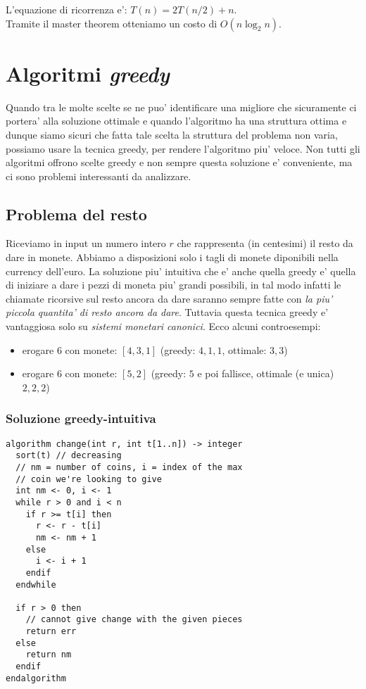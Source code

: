 \documentclass{article}
\begin{document}
L'equazione di ricorrenza e': $T(n) = 2T(n/2) + n$. \\
Tramite il master theorem otteniamo un costo di $O(n \log_2 n)$.

\section{Algoritmi \emph{greedy}}

Quando tra le molte scelte se ne puo' identificare una migliore che sicuramente
ci portera' alla soluzione ottimale e quando l'algoritmo ha una struttura ottima
e dunque siamo sicuri che fatta tale scelta la struttura del problema non varia,
possiamo usare la tecnica greedy, per rendere l'algoritmo piu' veloce.
Non tutti gli algoritmi offrono scelte greedy e non sempre questa soluzione e'
conveniente, ma ci sono problemi interessanti da analizzare.

\subsection{Problema del resto}

Riceviamo in input un numero intero $r$ che rappresenta (in centesimi) il resto
da dare in monete. Abbiamo a disposizioni solo i tagli di monete diponibili nella
currency dell'euro. La soluzione piu' intuitiva che e' anche quella greedy e'
quella di iniziare a dare i pezzi di moneta piu' grandi possibili, in tal modo
infatti le chiamate ricorsive sul resto ancora da dare saranno sempre fatte con
\emph{la piu' piccola quantita' di resto ancora da dare}. Tuttavia questa tecnica
greedy e' vantaggiosa solo su \emph{sistemi monetari canonici}. Ecco alcuni controesempi:

\begin{itemize}
  \item erogare $6$ con monete: $[4,3,1]$ (greedy: $4,1,1$, ottimale: $3,3$)
  \item erogare $6$ con monete: $[5,2]$ (greedy: $5$ e poi fallisce, ottimale (e unica) $2,2,2$)
\end{itemize}

\subsubsection{Soluzione greedy-intuitiva}

\begin{lstlisting}
algorithm change(int r, int t[1..n]) -> integer
  sort(t) // decreasing
  // nm = number of coins, i = index of the max
  // coin we're looking to give
  int nm <- 0, i <- 1
  while r > 0 and i < n
    if r >= t[i] then
      r <- r - t[i]
      nm <- nm + 1
    else
      i <- i + 1
    endif
  endwhile
  
  if r > 0 then
    // cannot give change with the given pieces
    return err
  else
    return nm
  endif
endalgorithm
\end{lstlisting}
\end{document}
